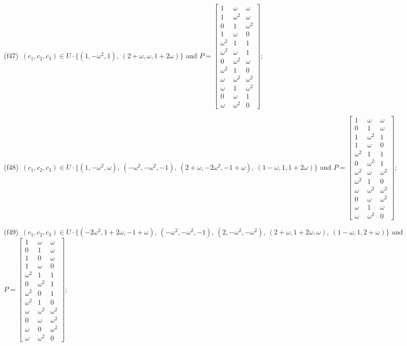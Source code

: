 \begin{enumerate}
\item[(f47)\,\newitem] $(c_1,c_2,c_3)\in U\cdot\{(1,-\omega^2,1),\allowbreak\ (2+\omega,\omega,1+2\omega)\}$ and $P=\begin{bmatrix}1&\omega&\omega\\1&\omega^2&\omega\\0&1&\omega^2\\1&\omega&0\\\omega^2&1&1\\\omega^2&\omega&1\\0&\omega^2&\omega\\\omega^2&1&0\\\omega&\omega^2&\omega^2\\\omega&1&\omega^2\\0&\omega&1\\\omega&\omega^2&0\end{bmatrix}$;
\item[(f48)\,\newitem] $(c_1,c_2,c_3)\in U\cdot\{(1,-\omega^2,\omega),\allowbreak\ (-\omega^2,-\omega^2,-1),\allowbreak\ (2+\omega,-2\omega^2,-1+\omega),\allowbreak\ (1-\omega,1,1+2\omega)\}$ and $P=\begin{bmatrix}1&\omega&\omega\\0&1&\omega\\1&\omega^2&1\\1&\omega&0\\\omega^2&1&1\\0&\omega^2&1\\\omega^2&\omega&\omega^2\\\omega^2&1&0\\\omega&\omega^2&\omega^2\\0&\omega&\omega^2\\\omega&1&\omega\\\omega&\omega^2&0\end{bmatrix}$;
\item[(f49)\,\newitem] $(c_1,c_2,c_3)\in U\cdot\{(-2\omega^2,1+2\omega,-1+\omega),\allowbreak\ (-\omega^2,-\omega^2,-1),\allowbreak\ (2,-\omega^2,-\omega^2),\allowbreak\ (2+\omega,1+2\omega,\omega),\allowbreak\ (1-\omega,1,2+\omega)\}$ and $P=\begin{bmatrix}1&\omega&\omega\\0&1&\omega\\1&0&\omega\\1&\omega&0\\\omega^2&1&1\\0&\omega^2&1\\\omega^2&0&1\\\omega^2&1&0\\\omega&\omega^2&\omega^2\\0&\omega&\omega^2\\\omega&0&\omega^2\\\omega&\omega^2&0\end{bmatrix}$;

\end{enumerate}

